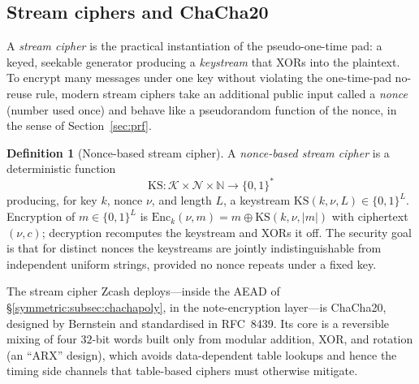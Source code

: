 \documentclass[11pt,a4paper]{article}
\theoremstyle{definition}
\newtheorem{definition}[theorem]{Definition}
\theoremstyle{remark}
\newcommand{\N}{\ensuremath{\mathbb{N}}}
\begin{document}
\subsection{Stream ciphers and ChaCha20}\label{symmetric:subsec:stream}

A \emph{stream cipher} is the practical instantiation of the
pseudo-one-time pad: a keyed, seekable generator producing a
\emph{keystream} that XORs into the plaintext. To encrypt many
messages under one key without violating the one-time-pad no-reuse
rule, modern stream ciphers take an additional public input called a
\emph{nonce} (number used once) and behave like a pseudorandom
function of the nonce, in the sense of Section~\ref{sec:prf}.

\begin{definition}[Nonce-based stream cipher]\label{symmetric:def-stream}
A \emph{nonce-based stream cipher} is a deterministic function
\[
\mathrm{KS} : \mathcal{K} \times \mathcal{N} \times \N
\to \{0,1\}^{\ast}
\]
producing, for key \(k\), nonce \(\nu\), and length \(L\), a keystream
\(\mathrm{KS}(k, \nu, L) \in \{0,1\}^{L}\). Encryption of
\(m \in \{0,1\}^{L}\) is
\(\mathrm{Enc}_{k}(\nu, m) = m \oplus \mathrm{KS}(k, \nu, |m|)\) with
ciphertext \((\nu, c)\); decryption recomputes the keystream and XORs
it off. The security goal is that for distinct nonces the keystreams
are jointly indistinguishable from independent uniform strings,
provided no nonce repeats under a fixed key.
\end{definition}

The stream cipher Zcash deploys---inside the AEAD of
\S\ref{symmetric:subsec:chachapoly}, in the note-encryption layer---is
\textsf{ChaCha20}, designed by Bernstein and standardised in
RFC~8439. Its core is a reversible mixing of four \(32\)-bit words
built only from modular addition, XOR, and rotation (an ``ARX''
design), which avoids data-dependent table lookups and hence the
timing side channels that table-based ciphers must otherwise mitigate.
\end{document}
